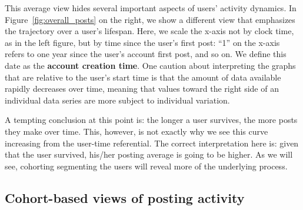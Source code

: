 This average view hides several important aspects of users' activity dynamics.  In Figure~\ref{fig:overall_posts} on the right, we show a different view that emphasizes the trajectory over a user's lifespan.  Here, we scale the x-axis not by clock time, as in the left figure, but by time since the user's first post: ``1'' on the x-axis refers to one year since the user's account first post, and so on. We define this date as the \textbf{account creation time}.
One caution about interpreting the graphs that are relative to the user's start time is that the amount of data available rapidly decreases over time, meaning that values toward the right side of an individual data series are more subject to individual variation.  



A tempting conclusion at this point is: the longer a user survives, the more posts they make over time. This, however, is not exactly why we see this curve increasing from the user-time referential. The correct interpretation here is: given that the user survived, his/her posting average is going to be higher. As we will see, cohorting segmenting the users will reveal more of the underlying process. 


\subsection{Cohort-based views of posting activity}

